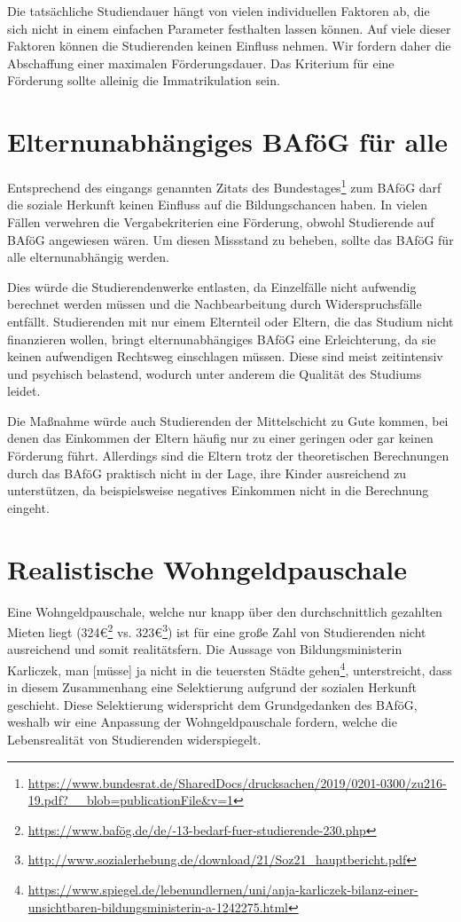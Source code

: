 \documentclass[DIV=calc]{scrartcl}
\begin{document}
Die tatsächliche Studiendauer hängt von vielen individuellen Faktoren ab, die sich nicht in einem einfachen Parameter festhalten lassen können. Auf viele dieser Faktoren können die Studierenden keinen Einfluss nehmen. Wir fordern daher die Abschaffung einer maximalen Förderungsdauer. Das Kriterium für eine Förderung sollte alleinig die Immatrikulation sein.

\section{Elternunabhängiges BAföG für alle}

Entsprechend des eingangs genannten Zitats des Bundestages\footnote{\url{https://www.bundesrat.de/SharedDocs/drucksachen/2019/0201-0300/zu216-19.pdf?__blob=publicationFile&v=1}} zum BAföG darf die soziale Herkunft keinen Einfluss auf die Bildungschancen haben. In vielen Fällen verwehren die Vergabekriterien eine Förderung, obwohl Studierende auf BAföG angewiesen wären. Um diesen Missstand zu beheben, sollte das BAföG für alle elternunabhängig werden.

Dies würde die Studierendenwerke entlasten, da Einzelfälle nicht aufwendig berechnet werden müssen und die Nachbearbeitung durch Widerspruchsfälle entfällt. 
Studierenden mit nur einem Elternteil oder Eltern, die das Studium nicht finanzieren wollen, bringt elternunabhängiges BAföG eine Erleichterung, da sie keinen aufwendigen Rechtsweg einschlagen müssen. Diese sind meist zeitintensiv und psychisch belastend, wodurch unter anderem die Qualität des Studiums leidet.

Die Maßnahme würde auch Studierenden der Mittelschicht zu Gute kommen, bei denen das Einkommen der Eltern häufig nur zu einer geringen oder gar keinen Förderung führt. Allerdings sind die Eltern trotz der theoretischen Berechnungen durch das BAföG praktisch nicht in der Lage, ihre Kinder ausreichend zu unterstützen, da beispielsweise negatives Einkommen nicht in die Berechnung eingeht.

\section{Realistische Wohngeldpauschale}

Eine Wohngeldpauschale, welche nur knapp über den durchschnittlich gezahlten Mieten liegt (324\euro\footnote{\url{https://www.bafög.de/de/-13-bedarf-fuer-studierende-230.php}} vs. 323\euro\footnote{\url{http://www.sozialerhebung.de/download/21/Soz21_hauptbericht.pdf}}) ist für eine große Zahl von Studierenden nicht ausreichend und somit realitätsfern. Die Aussage von Bildungsministerin Karliczek, \glqq man [müsse] ja nicht in die teuersten Städte gehen\grqq{}\footnote{\url{https://www.spiegel.de/lebenundlernen/uni/anja-karliczek-bilanz-einer-unsichtbaren-bildungsministerin-a-1242275.html}}, unterstreicht, dass in diesem Zusammenhang eine Selektierung aufgrund der sozialen Herkunft geschieht. Diese Selektierung widerspricht dem Grundgedanken des BAföG, weshalb wir eine Anpassung der Wohngeldpauschale fordern, welche die Lebensrealität von Studierenden widerspiegelt.
\end{document}
